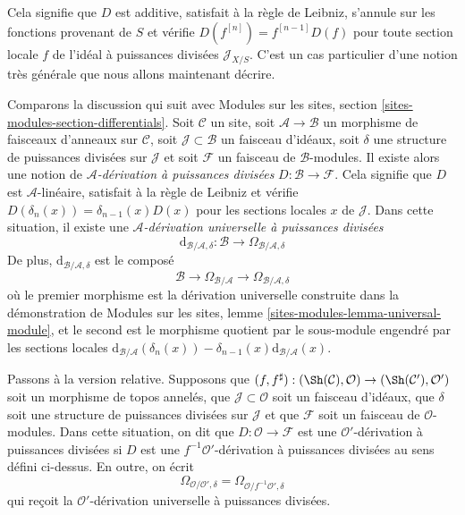 \noindent
Cela signifie que $D$ est additive, satisfait à la règle de Leibniz, s'annule sur les
fonctions provenant de $S$ et vérifie $D(f^{[n]}) = f^{[n - 1]}D(f)$
pour toute section locale $f$ de l'idéal à puissances divisées $\mathcal{J}_{X/S}$.
C'est un cas particulier d'une notion très générale que nous allons maintenant décrire.

\medskip\noindent
Comparons la discussion qui suit avec
Modules sur les sites, section \ref{sites-modules-section-differentials}. Soit
$\mathcal{C}$ un site, soit $\mathcal{A} \to \mathcal{B}$ un
morphisme de faisceaux d'anneaux sur $\mathcal{C}$, soit $\mathcal{J} \subset \mathcal{B}$
un faisceau d'idéaux, soit $\delta$ une structure de puissances divisées sur
$\mathcal{J}$ et soit $\mathcal{F}$ un faisceau de $\mathcal{B}$-modules.
Il existe alors une notion de {\it $\mathcal{A}$-dérivation à puissances divisées}
$D : \mathcal{B} \to \mathcal{F}$. Cela signifie que $D$ est $\mathcal{A}$-linéaire,
satisfait à la règle de Leibniz et vérifie
$D(\delta_n(x)) = \delta_{n - 1}(x)D(x)$ pour les sections locales $x$ de
$\mathcal{J}$. Dans cette situation, il existe une
{\it $\mathcal{A}$-dérivation universelle à puissances divisées}
$$
\text{d}_{\mathcal{B}/\mathcal{A}, \delta} :
\mathcal{B}
\longrightarrow
\Omega_{\mathcal{B}/\mathcal{A}, \delta}
$$
De plus, $\text{d}_{\mathcal{B}/\mathcal{A}, \delta}$ est le composé
$$
\mathcal{B}
\longrightarrow
\Omega_{\mathcal{B}/\mathcal{A}}
\longrightarrow
\Omega_{\mathcal{B}/\mathcal{A}, \delta}
$$
où le premier morphisme est la dérivation universelle construite dans la démonstration
de Modules sur les sites, lemme \ref{sites-modules-lemma-universal-module},
et le second est le morphisme quotient par le sous-module engendré par
les sections locales
$\text{d}_{\mathcal{B}/\mathcal{A}}(\delta_n(x)) -
\delta_{n - 1}(x)\text{d}_{\mathcal{B}/\mathcal{A}}(x)$.

\medskip\noindent
Passons à la version relative. Supposons que
$(f, f^\sharp) : (\Sh(\mathcal{C}), \mathcal{O}) \to
(\Sh(\mathcal{C}'), \mathcal{O}')$ soit un morphisme de topos annelés,
que $\mathcal{J} \subset \mathcal{O}$ soit un faisceau d'idéaux, que $\delta$ soit une
structure de puissances divisées sur $\mathcal{J}$ et que $\mathcal{F}$ soit un faisceau
de $\mathcal{O}$-modules. Dans cette situation, on dit que
$D : \mathcal{O} \to \mathcal{F}$ est une $\mathcal{O}'$-dérivation à puissances divisées
si $D$ est une $f^{-1}\mathcal{O}'$-dérivation à puissances divisées au sens défini ci-dessus.
En outre, on écrit
$$
\Omega_{\mathcal{O}/\mathcal{O}', \delta} =
\Omega_{\mathcal{O}/f^{-1}\mathcal{O}', \delta}
$$
qui reçoit la
$\mathcal{O}'$-dérivation universelle à puissances divisées.

